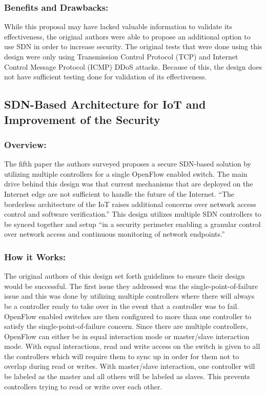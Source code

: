 \subsubsection {Benefits and Drawbacks:}

While this proposal may have lacked valuable information to validate its effectiveness, the original authors were able to propose an additional option to use SDN in order to increase security. The original tests that were done using this design were only using Transmission Control Protocol (TCP) and Internet Control Message Protocol (ICMP) DDoS attacks. Because of this, the design does not have sufficient testing done for validation of its effectiveness.

\subsection {SDN-Based Architecture for IoT and Improvement of the Security}
\subsubsection {Overview:}

The fifth paper the authors surveyed proposes a secure SDN-based solution by utilizing multiple controllers for a single OpenFlow enabled switch. The main drive behind this design was that current mechanisms that are deployed on the Internet edge are not sufficient to handle the future of the Internet. “The borderless architecture of the IoT raises additional concerns over network access control and software verification.” \cite {flauzac2015sdn} This design utilizes multiple SDN controllers to be synced together and setup “in a security perimeter enabling a granular control over network access and continuous monitoring of network endpoints.” \cite {flauzac2015sdn}

\subsubsection {How it Works:}

The original authors of this design set forth guidelines to ensure their design would be successful. The first issue they addressed was the single-point-of-failure issue and this was done by utilizing multiple controllers where there will always be a controller ready to take over in the event that a controller was to fail. OpenFlow enabled switches are then configured to more than one controller to satisfy the single-point-of-failure concern. Since there are multiple controllers, OpenFlow can either be in equal interaction mode or master/slave interaction mode. With equal interactions, read and write access on the switch is given to all the controllers which will require them to sync up in order for them not to overlap during read or writes. With master/slave interaction, one controller will be labeled as the master and all others will be labeled as slaves. This prevents controllers trying to read or write over each other. 

